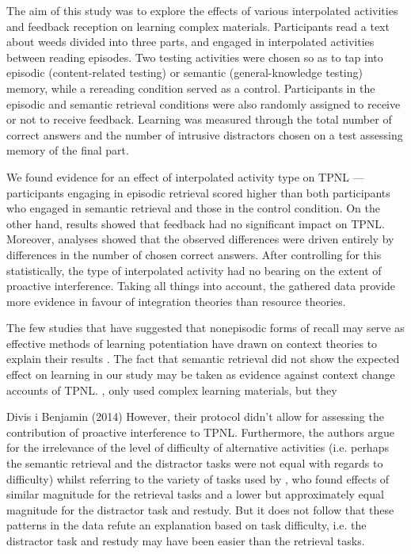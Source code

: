 \documentclass[../main.tex]{subfiles}
\begin{document}
The aim of this study was to explore the effects of various interpolated activities
and feedback reception on learning complex materials. Participants read a text
about weeds divided into three parts, and engaged in interpolated activities between
reading episodes. Two testing activities were chosen so as to tap into episodic 
(content-related testing) or semantic (general-knowledge testing) memory, while a 
rereading condition served as a control. Participants in the episodic and semantic
retrieval conditions were also randomly assigned to receive or not to receive 
feedback. Learning was measured through the total number of correct answers 
and the number of intrusive distractors chosen on a test assessing memory of the
final part.

We found evidence for an effect of interpolated activity type on TPNL --- participants 
engaging in episodic retrieval scored higher than both participants who engaged in 
semantic retrieval and those in the control condition. On the other hand, results 
showed that feedback had no significant impact on TPNL. Moreover, analyses showed
that the observed differences were driven entirely by differences in the number of
chosen correct answers. After controlling for this statistically, the type of 
interpolated activity had no bearing on the extent of proactive interference.
Taking all things into account, the gathered data provide more evidence in
favour of integration theories than resource theories. 

The few studies that have suggested that nonepisodic forms of recall may serve
as effective methods of learning potentiation have drawn on context theories to
explain their results \citep{divisRetrievalSpeedsContext2014, pastotterRetrievalLearningFacilitates2011}.
The fact that semantic retrieval did not show the expected effect on learning
in our study may be taken as evidence against context change accounts of TPNL.
, only \cite{divisRetrievalSpeedsContext2014} used complex learning materials,
but they 

Divis i Benjamin (2014)
However, their protocol didn't allow for assessing the contribution of proactive interference to TPNL. Furthermore, the authors argue for the irrelevance of the level of difficulty of alternative activities (i.e. perhaps the semantic retrieval and the distractor tasks were not equal with regards to difficulty) whilst referring to the variety of tasks used by \cite{pastotterRetrievalLearningFacilitates2011}, who found effects of similar magnitude for the retrieval tasks and a lower but approximately equal magnitude for the distractor task and restudy. But it does not follow that these patterns in the data refute an explanation based on task difficulty, i.e. the distractor task and restudy may have been easier than the retrieval tasks. 
\end{document}
